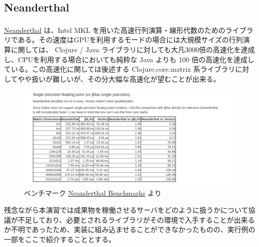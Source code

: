 \documentclass{scrartcl}
\begin{document}
\subsection{Neanderthal}
\label{sec:orgecfe578}
\href{http://neanderthal.uncomplicate.org/}{Neanderthal} は、Intel \textsuperscript{\textregistered} MKL を用いた高速行列演算・線形代数のためのライブラリである。その速度はGPUを利用するモードの場合には大規模サイズの行列演算に関しては、 Clojure / Java ライブラリに対しても大凡3000倍の高速化を達成し、CPUを利用する場合においても純粋な Java よりも 100 倍の高速化を達成している。この高速化に関しては後述する Clojure.core.matrix 系ライブラリに対してやや扱いが難しいが、その分大幅な高速化が望むことが出来る。\\

\begin{figure}[htbp]
\centering
\includegraphics[width=.9\linewidth]{./neanderthal.png}
\caption{ベンチマーク \href{http://neanderthal.uncomplicate.org/articles/benchmarks.html}{Neanderthal Benchmarks} より}
\end{figure}

\newpage
残念ながら本演習では成果物を稼働させるサーバをどのように扱うかについて協議が不足しており、必要とされるライブラリがその環境で入手することが出来るか不明であったため、実装に組み込ませることができなかったものの、実行例の一部をここで紹介することとする。\\
\end{document}
